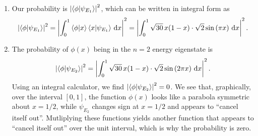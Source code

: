 \documentclass{article}
\begin{document}
\begin{enumerate}[label=(\alph*)]
    \item Our probability is $\left| \braket{\phi}{\psi_{E_1}} \right|^2$, which can be written in integral form as
    \[
    \left| \braket{\phi}{\psi_{E_1}} \right|^2 = \left| \int_0^1 \braket{\phi}{x} \braket{x}{\psi_{E_1}} \, \dd x \right|^2 = \left| \int_{0}^{1} \sqrt{30}\,x(1-x) \cdot \sqrt{2} \sin \left( \pi x \right) \, \dd x \right|^2.
    \]
    \item The probability of $\phi(x)$ being in the $n=2$ energy eigenstate is
    \[
    \left| \braket{\phi}{\psi_{E_2}} \right|^2 = \left| \int_{0}^{1} \sqrt{30}\,x(1-x) \cdot \sqrt{2} \sin \left( 2 \pi x \right) \, \dd x \right|^2.
    \]
    Using an integral calculator, we find $\left| \braket{\phi}{\psi_{E_2}} \right|^2 =0$. We see that, graphically, over the interval $[0,1]$, the function $\phi(x)$ looks like a parabola symmetric about $x=1/2$, while $\psi_{E_2}$ changes sign at $x=1/2$ and appears to ``cancel itself out''. Mutliplying these functions yields another function that appears to ``cancel itself out'' over the unit interval, which is why the probability is zero.
\end{enumerate}
\end{document}
